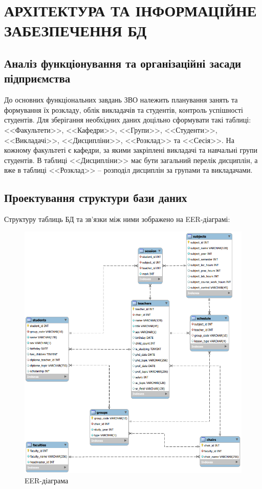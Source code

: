 \newpage
\chapter{АРХІТЕКТУРА ТА ІНФОРМАЦІЙНЕ ЗАБЕЗПЕЧЕННЯ БД}
\section{Аналіз функціонування та організаційні засади підприємства}
До основних функціональних завдань ЗВО належить планування занять та формування їх розкладу,
облік викладачів та студентів, контроль успішності студентів.
Для зберігання необхідних даних доцільно сформувати такі таблиці:
<<Факультети>>, <<Кафедри>>, <<Групи>>, <<Студенти>>, <<Викладачі>>, 
<<Дисципліни>>, <<Розклад>> та <<Сесія>>. На кожному факультеті є кафедри,
за якими закріплені викладачі та навчальні групи студентів. В таблиці <<Дисципліни>>
має бути загальний перелік дисциплін, а вже в таблиці <<Розклад>> -- розподіл
дисциплін за групами та викладачами.

\section{Проектування структури бази даних}
Структуру таблиць БД та зв'язки між ними зображено на EER-діаграмі:
\begin{figure}[h]
    \centering
    \includegraphics[scale=0.8]{pics/eer.png}
    \caption{EER-діаграма}
\end{figure}

